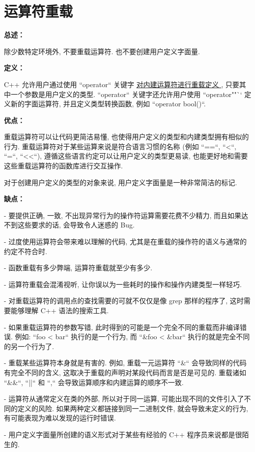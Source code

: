 \section{运算符重载}

\textbf{总述：}

除少数特定环境外, 不要重载运算符. 也不要创建用户定义字面量.

\textbf{定义：}

C++ 允许用户通过使用 ``operator`` 关键字 \href{http://en.cppreference.com/w/cpp/language/operators}{对内建运算符进行重载定义 } , 只要其中一个参数是用户定义的类型. ``operator`` 关键字还允许用户使用 ``operator""`` 定义新的字面运算符, 并且定义类型转换函数, 例如 ``operator bool()``.

\textbf{优点：}

重载运算符可以让代码更简洁易懂, 也使得用户定义的类型和内建类型拥有相似的行为. 重载运算符对于某些运算来说是符合语言习惯的名称 (例如 ``==``, ``<``, ``=``, ``<<``), 遵循这些语言约定可以让用户定义的类型更易读, 也能更好地和需要这些重载运算符的函数库进行交互操作.

对于创建用户定义的类型的对象来说, 用户定义字面量是一种非常简洁的标记.

\textbf{缺点：}

- 要提供正确, 一致, 不出现异常行为的操作符运算需要花费不少精力, 而且如果达不到这些要求的话, 会导致令人迷惑的 Bug.

- 过度使用运算符会带来难以理解的代码, 尤其是在重载的操作符的语义与通常的约定不符合时.

- 函数重载有多少弊端, 运算符重载就至少有多少.

- 运算符重载会混淆视听, 让你误以为一些耗时的操作和操作内建类型一样轻巧.

- 对重载运算符的调用点的查找需要的可就不仅仅是像 grep 那样的程序了, 这时需要能够理解 C++ 语法的搜索工具.

- 如果重载运算符的参数写错, 此时得到的可能是一个完全不同的重载而非编译错误. 例如: ``foo < bar`` 执行的是一个行为, 而 ``\&foo < \&bar`` 执行的就是完全不同的另一个行为了.

- 重载某些运算符本身就是有害的. 例如, 重载一元运算符 ``\&`` 会导致同样的代码有完全不同的含义, 这取决于重载的声明对某段代码而言是否是可见的. 重载诸如 ``\&\&``, ``||`` 和 ``,`` 会导致运算顺序和内建运算的顺序不一致.

- 运算符从通常定义在类的外部, 所以对于同一运算, 可能出现不同的文件引入了不同的定义的风险. 如果两种定义都链接到同一二进制文件, 就会导致未定义的行为, 有可能表现为难以发现的运行时错误.

- 用户定义字面量所创建的语义形式对于某些有经验的 C++ 程序员来说都是很陌生的.

